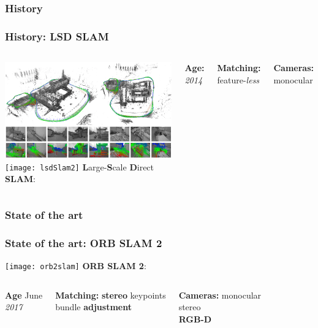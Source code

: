 \documentclass[16pt]{beamer}
\begin{document}
\subsubsection*{History}
\begin{frame}
  \frametitle{History:   LSD SLAM}
  \begin{columns}
    \includegraphics[width=1\textwidth]{lsdSlam1}
    \texttt{[image: lsdSlam2]}
    \textbf{L}arge-\textbf{S}cale \textbf{D}irect \textbf{SLAM}:\\\medskip
    \begin{block}{\textbf{Age:}}
      \textsl{2014}
    \end{block}
    \bigskip
    \begin{block}{\textbf{Matching:}}
      feature-\textsl{less}
    \end{block}
    \bigskip
    \begin{block}{\textbf{Cameras:}}
      monocular
    \end{block}
  \end{columns}
\end{frame}
\subsubsection*{State of the art}
\begin{frame}
  \frametitle{State of the art:   ORB SLAM 2 }
  
  \texttt{[image: orb2slam]}
  \medskip
  \textbf{ ORB SLAM 2}:
  \smallskip
  \begin{columns}
    \begin{block}{\textbf{Age}}
      June\\
      \textsl{2017}
    \end{block}
    \begin{block}{\textbf{Matching:}}
      \textbf{stereo} keypoints\\
      bundle \textbf{adjustment}
    \end{block}
    \begin{block}{\textbf{Cameras:}}
      monocular\\
      stereo\\
      \textbf{RGB-D}
    \end{block}
 
  \end{columns}
\end{frame}
\end{document}
